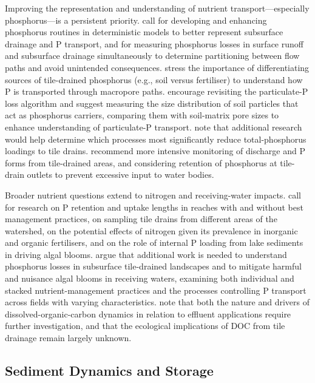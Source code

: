 Improving the representation and understanding of nutrient transport---especially phosphorus---is a persistent priority. \textcite{King2015} call for developing and enhancing phosphorus routines in deterministic models to better represent subsurface drainage and P transport, and for measuring phosphorus losses in surface runoff and subsurface drainage simultaneously to determine partitioning between flow paths and avoid unintended consequences. \textcite{Williams2016} stress the importance of differentiating sources of tile-drained phosphorus (e.g., soil versus fertiliser) to understand how P is transported through macropore paths. \textcite{Qi2018} encourage revisiting the particulate-P loss algorithm and suggest measuring the size distribution of soil particles that act as phosphorus carriers, comparing them with soil-matrix pore sizes to enhance understanding of particulate-P transport. \textcite{Geohring2001} note that additional research would help determine which processes most significantly reduce total-phosphorus loadings to tile drains. \textcite{Zimmer2016} recommend more intensive monitoring of discharge and P forms from tile-drained areas, and considering retention of phosphorus at tile-drain outlets to prevent excessive input to water bodies.

Broader nutrient questions extend to nitrogen and receiving-water impacts. \textcite{Clement2017} call for research on P retention and uptake lengths in reaches with and without best management practices, on sampling tile drains from different areas of the watershed, on the potential effects of nitrogen given its prevalence in inorganic and organic fertilisers, and on the role of internal P loading from lake sediments in driving algal blooms. \textcite{King2018} argue that additional work is needed to understand phosphorus losses in subsurface tile-drained landscapes and to mitigate harmful and nuisance algal blooms in receiving waters, examining both individual and stacked nutrient-management practices and the processes controlling P transport across fields with varying characteristics. \textcite{Ruark2009} note that both the nature and drivers of dissolved-organic-carbon dynamics in relation to effluent applications require further investigation, and that the ecological implications of DOC from tile drainage remain largely unknown.

\subsection{Sediment Dynamics and Storage}


